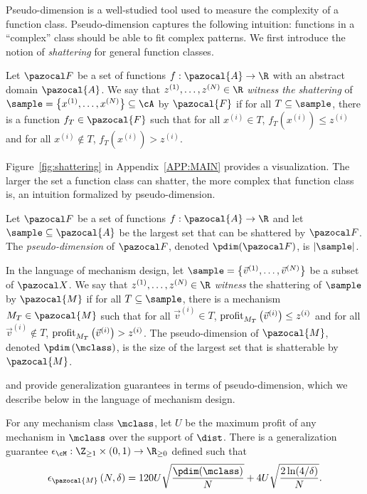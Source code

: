 Pseudo-dimension is a well-studied tool used to measure the complexity of a function class.
Pseudo-dimension captures the following intuition: functions in a ``complex'' class should be able to fit complex patterns.
We first introduce the notion of \emph{shattering} for general function classes.

\begin{definition}
Let $\fclass$ be a set of functions $f:\pazocal{A} \to \R$ with an abstract domain $\pazocal{A}$. We say that $z^{\left(1\right)}, \dots, z^{\left(N\right)} \in \R$ \emph{witness the shattering} of $\sample= \left\{x^{\left(1\right)}, \dots, x^{\left(N\right)}\right\} \subseteq \cA$ by $\pazocal{F}$ if for all $T \subseteq \sample$, there is a function $f_T \in \pazocal{F}$ such that for all $x^{\left(i\right)} \in T$, $f_T\left(x^{\left(i\right)}\right) \leq z^{\left(i\right)}$ and for all $x^{\left(i\right)} \not\in T$, $f_T\left(x^{\left(i\right)}\right) > z^{\left(i\right)}$.
\end{definition}


Figure~\ref{fig:shattering} in Appendix~\ref{APP:MAIN} provides a visualization. The larger the set a function class can shatter, the more complex that function class is, an intuition formalized by pseudo-dimension.

\begin{definition}
Let $\fclass$ be a set of functions $f:\pazocal{A} \to \R$ and let $\sample \subseteq \pazocal{A}$ be the largest set that can be shattered by $\fclass$. The \emph{pseudo-dimension} of $\fclass$, denoted $\pdim(\fclass)$, is  $|\sample|$.
\end{definition}

In the language of mechanism design, let $\sample= \left\{\vec{v}^{\left(1\right)}, \dots, \vec{v}^{\left(N\right)}\right\}$ be a subset of $\domain$. We say that $z^{\left(1\right)}, \dots, z^{\left(N\right)} \in \R$ \emph{witness} the shattering of $\sample$ by $\pazocal{M}$ if for all $T \subseteq \sample$, there is a mechanism $M_T \in \pazocal{M}$ such that for all $\vec{v}^{\left(i\right)} \in T$, $\textnormal{profit}_{M_T}\left(\vec{v}^{\left(i\right)}\right) \leq z^{\left(i\right)}$ and for all $\vec{v}^{\left(i\right)} \not\in T$, $\textnormal{profit}_{M_T}\left(\vec{v}^{\left(i\right)}\right) > z^{\left(i\right)}$. The pseudo-dimension of $\pazocal{M}$, denoted $\pdim\left(\mclass\right)$, is the size of the largest set that is shatterable by $\pazocal{M}$.

\citet{Pollard84:Convergence} and \citet{Dudley87:Universal} provide generalization guarantees in terms of pseudo-dimension, which we describe below in the language of mechanism design.
\begin{theorem}\label{thm:pdim}
For any mechanism class $\mclass$, let $U$ be the maximum profit of any mechanism in $\mclass$ over the support of $\dist$. There is a generalization guarantee $\epsilon_{\cM} : \Z_{\geq 1} \times (0,1) \to \R_{\geq 0}$ defined such that \[\epsilon_{\pazocal{M}}\left(N, \delta\right) = 120U\sqrt{\frac{\pdim(\mclass)}{N}} + 4U \sqrt{\frac{2\ln(4/\delta)}{N}}.\]
\end{theorem}


